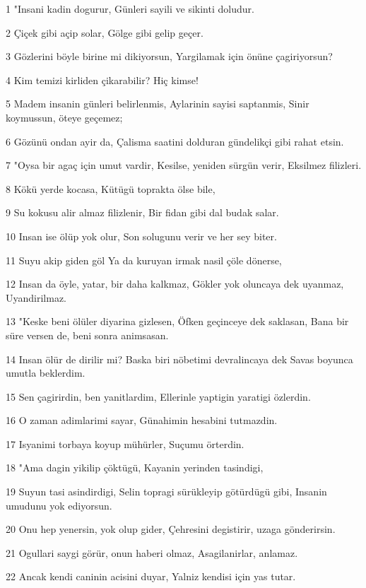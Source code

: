 \par 1 "Insani kadin dogurur, Günleri sayili ve sikinti doludur.
\par 2 Çiçek gibi açip solar, Gölge gibi gelip geçer.
\par 3 Gözlerini böyle birine mi dikiyorsun, Yargilamak için önüne çagiriyorsun?
\par 4 Kim temizi kirliden çikarabilir? Hiç kimse!
\par 5 Madem insanin günleri belirlenmis, Aylarinin sayisi saptanmis, Sinir koymussun, öteye geçemez;
\par 6 Gözünü ondan ayir da, Çalisma saatini dolduran gündelikçi gibi rahat etsin.
\par 7 "Oysa bir agaç için umut vardir, Kesilse, yeniden sürgün verir, Eksilmez filizleri.
\par 8 Kökü yerde kocasa, Kütügü toprakta ölse bile,
\par 9 Su kokusu alir almaz filizlenir, Bir fidan gibi dal budak salar.
\par 10 Insan ise ölüp yok olur, Son solugunu verir ve her sey biter.
\par 11 Suyu akip giden göl Ya da kuruyan irmak nasil çöle dönerse,
\par 12 Insan da öyle, yatar, bir daha kalkmaz, Gökler yok oluncaya dek uyanmaz, Uyandirilmaz.
\par 13 "Keske beni ölüler diyarina gizlesen, Öfken geçinceye dek saklasan, Bana bir süre versen de, beni sonra animsasan.
\par 14 Insan ölür de dirilir mi? Baska biri nöbetimi devralincaya dek Savas boyunca umutla beklerdim.
\par 15 Sen çagirirdin, ben yanitlardim, Ellerinle yaptigin yaratigi özlerdin.
\par 16 O zaman adimlarimi sayar, Günahimin hesabini tutmazdin.
\par 17 Isyanimi torbaya koyup mühürler, Suçumu örterdin.
\par 18 "Ama dagin yikilip çöktügü, Kayanin yerinden tasindigi,
\par 19 Suyun tasi asindirdigi, Selin topragi sürükleyip götürdügü gibi, Insanin umudunu yok ediyorsun.
\par 20 Onu hep yenersin, yok olup gider, Çehresini degistirir, uzaga gönderirsin.
\par 21 Ogullari saygi görür, onun haberi olmaz, Asagilanirlar, anlamaz.
\par 22 Ancak kendi caninin acisini duyar, Yalniz kendisi için yas tutar.

